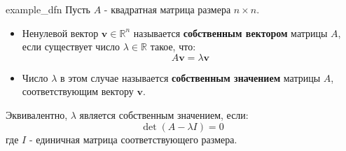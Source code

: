 \newpage
\begin{dfn}{example_dfn}
Пусть $A$ - квадратная матрица размера $n \times n$.

\begin{itemize}
\item Ненулевой вектор $\mathbf{v} \in \mathbb{R}^n$ называется \textbf{собственным вектором} матрицы $A$, если существует число $\lambda \in \mathbb{R}$ такое, что:
$$ A\mathbf{v} = \lambda\mathbf{v} $$

\item Число $\lambda$ в этом случае называется \textbf{собственным значением} матрицы $A$, соответствующим вектору $\mathbf{v}$.
\end{itemize}

Эквивалентно, $\lambda$ является собственным значением, если:
\begin{equation*}
\det(A - \lambda I) = 0
\end{equation*}
где $I$ - единичная матрица соответствующего размера.
\end{dfn}{}
